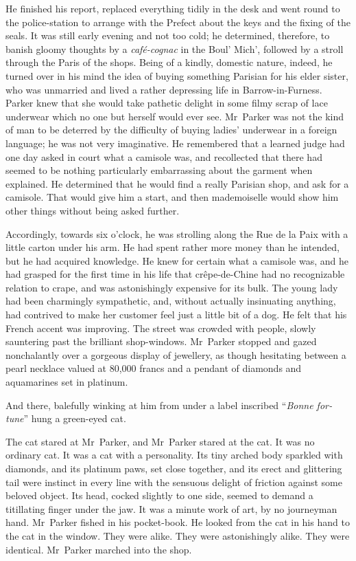 He finished his report, replaced everything tidily in the desk and went round to the police-station to arrange with the Prefect about the keys and the fixing of the seals. It was still early evening and not too cold; he determined, therefore, to banish gloomy thoughts by a \foreignlanguage{french}{\textit{café-cognac}} in the Boul' Mich', followed by a stroll through the Paris of the shops. Being of a kindly, domestic nature, indeed, he turned over in his mind the idea of buying something Parisian for his elder sister, who was unmarried and lived a rather depressing life in Barrow-in-Furness. Parker knew that she would take pathetic delight in some filmy scrap of lace underwear which no one but herself would ever see. Mr~Parker was not the kind of man to be deterred by the difficulty of buying ladies' underwear in a foreign language; he was not very imaginative. He remembered that a learned judge had one day asked in court what a camisole was, and recollected that there had seemed to be nothing particularly embarrassing about the garment when explained. He determined that he would find a really Parisian shop, and ask for a camisole. That would give him a start, and then mademoiselle would show him other things without being asked further.

Accordingly, towards six o'clock, he was strolling along the Rue de la Paix with a little carton under his arm. He had spent rather more money than he intended, but he had acquired knowledge. He knew for certain what a camisole was, and he had grasped for the first time in his life that crêpe-de-Chine had no recognizable relation to crape, and was astonishingly expensive for its bulk. The young lady had been charmingly sympathetic, and, without actually insinuating anything, had contrived to make her customer feel just a little bit of a dog. He felt that his French accent was improving. The street was crowded with people, slowly sauntering past the brilliant shop-windows. Mr~Parker stopped and gazed nonchalantly over a gorgeous display of jewellery, as though hesitating between a pearl necklace valued at 80,000 francs and a pendant of diamonds and aquamarines set in platinum.

And there, balefully winking at him from under a label inscribed \foreignquote{french}{\textit{Bonne fortune}} hung a green-eyed cat.

The cat stared at Mr~Parker, and Mr~Parker stared at the cat. It was no ordinary cat. It was a cat with a personality. Its tiny arched body sparkled with diamonds, and its platinum paws, set close together, and its erect and glittering tail were instinct in every line with the sensuous delight of friction against some beloved object. Its head, cocked slightly to one side, seemed to demand a titillating finger under the jaw. It was a minute work of art, by no journeyman hand. Mr~Parker fished in his pocket-book. He looked from the cat in his hand to the cat in the window. They were alike. They were astonishingly alike.  They were identical. Mr~Parker marched into the shop.

